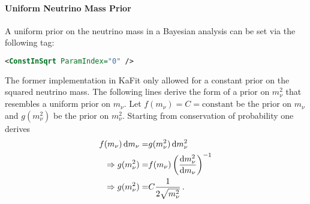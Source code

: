 \paragraph{Uniform Neutrino Mass Prior}
A uniform prior on the neutrino mass in a Bayesian analysis can be set via the following tag:
\begin{lstlisting}[language=XML]
<ConstInSqrt ParamIndex="0" />
\end{lstlisting}
The former implementation in KaFit only allowed for a constant prior on the squared neutrino mass. The following lines derive the form of a prior on $m_\nu^2$ that resembles a uniform prior on $m_\nu$. Let $f(m_\nu)=C=\mathrm{constant}$ be the prior on $m_\nu$ and $g(m_\nu^2)$ be the prior on $m_\nu^2$. Starting from conservation of probability one derives
\begin{align*}
f(m_\nu)\mathop{}\!\mathrm{d} m_\nu =& g(m_\nu^2) \mathop{}\!\mathrm{d} m_\nu^2 \\
\Rightarrow
g(m_\nu^2) =& f(m_\nu) \left( \frac{\mathop{}\!\mathrm{d} m_\nu^2}{\mathop{}\!\mathrm{d} m_\nu} \right)^{-1} \\
\Rightarrow
g(m_\nu^2) =& C \frac{1}{2\sqrt{m_\nu^2}}
\text{\,.}
\end{align*}